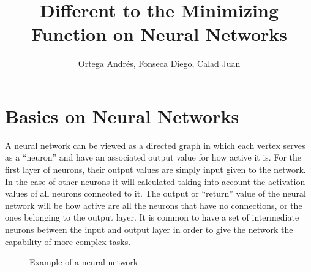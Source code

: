 \documentclass[a4paper, 12pts]{amsart}
\title{Different to the Minimizing Function on Neural Networks}
\author{Ortega Andrés, Fonseca Diego, Calad Juan\\
  \monthyeardate{\today}}
\begin{document}
\maketitle
\tableofcontents
\section{Basics on Neural Networks}
A neural network can be viewed as a directed graph in which each vertex serves
as a ``neuron'' and have an associated output value for how active it is.
For the first layer of neurons, their output values are simply input given to
the network. In the case of other neurons it will calculated taking into
account the activation values of all neurons connected to it. The output or
``return'' value of the neural network will be how active are all the neurons
that have no connections, or the ones belonging to the output layer. It is
common to have a set of intermediate neurons between the input and output layer
in order to give the network the capability of more complex tasks.

\begin{figure}[!h]
  \centering
  \def\layersep{2.5cm}

  \caption{Example of a neural network}
\end{figure}
\end{document}

